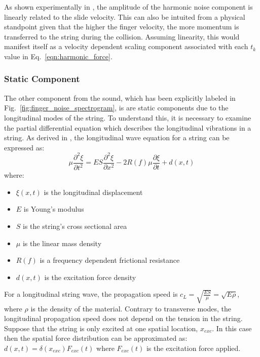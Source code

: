 \documentclass[main.tex]{subfiles}
\begin{document}
As shown experimentally in , the amplitude of the harmonic noise component is linearly related to the slide velocity. This can also be intuited from a physical standpoint given that the higher the finger velocity, the more momentum is transferred to the string during the collision. Assuming linearity, this would manifest itself as a velocity dependent scaling component associated with each $t_k$ value in Eq.~\ref{eqn:harmonic_force}.

\subsubsection{Static Component}
The other component from the sound, which has been explicitly labeled in Fig.~\ref{fig:finger_noise_spectrogram}, is are static components due to the longitudinal modes of the string. To understand this, it is necessary to examine the partial differential equation which describes the longitudinal vibrations in a string. As derived in , the longitudinal wave equation for a string can be expressed as:
\begin{equation}
    \mu \frac{\partial^2 \xi}{\partial t^2} = ES\frac{\partial^2 \xi}{\partial x^2} - 2R(f)\mu \frac{\partial \xi}{\partial t} + d(x,t)
    \label{eqn:longitudinal_PDE}
\end{equation}
where:
\begin{itemize}
    \item $\xi(x,t)$ is the longitudinal displacement
    \item $E$ is Young's modulus
    \item $S$ is the string's cross sectional area
    \item $\mu$ is the linear mass density
    \item $R(f)$ is a frequency dependent frictional resistance
    \item $d(x,t)$ is the excitation force density
\end{itemize}

For a longitudinal string wave, the propagation speed is $c_L = \sqrt{\frac{ES}{\mu}} = \sqrt{E \rho}$, where $\rho$ is the density of the material. Contrary to transverse modes, the longitudinal propagation speed does not depend on the tension in the string. Suppose that the string is only excited at one spatial location, $x_{exc}$. In this case then the spatial force distribution can be approximated as: $d(x,t) = \delta(x_{exc})F_{exc}(t)$ where $F_{exc}(t)$ is the excitation force applied.
\end{document}
